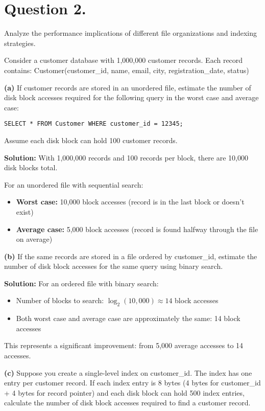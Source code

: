 \documentclass{article}
\begin{document}
\newpage
\section*{Question 2.}
Analyze the performance implications of different file organizations and indexing strategies.

Consider a customer database with 1,000,000 customer records. Each record contains:
Customer(customer\_id, name, email, city, registration\_date, status)

\textbf{(a)} If customer records are stored in an unordered file, estimate the number of disk block accesses required for the following query in the worst case and average case:
\begin{verbatim}
SELECT * FROM Customer WHERE customer_id = 12345;
\end{verbatim}

Assume each disk block can hold 100 customer records.

\textbf{Solution:}
With 1,000,000 records and 100 records per block, there are 10,000 disk blocks total.

For an unordered file with sequential search:
\begin{itemize}
    \item \textbf{Worst case:} 10,000 block accesses (record is in the last block or doesn't exist)
    \item \textbf{Average case:} 5,000 block accesses (record is found halfway through the file on average)
\end{itemize}

\textbf{(b)} If the same records are stored in a file ordered by customer\_id, estimate the number of disk block accesses for the same query using binary search.

\textbf{Solution:}
For an ordered file with binary search:
\begin{itemize}
    \item Number of blocks to search: $\log_2(10,000) \approx 14$ block accesses
    \item Both worst case and average case are approximately the same: 14 block accesses
\end{itemize}

This represents a significant improvement: from 5,000 average accesses to 14 accesses.

\textbf{(c)} Suppose you create a single-level index on customer\_id. The index has one entry per customer record. If each index entry is 8 bytes (4 bytes for customer\_id + 4 bytes for record pointer) and each disk block can hold 500 index entries, calculate the number of disk block accesses required to find a customer record.
\end{document}

